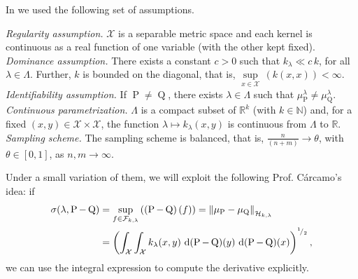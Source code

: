 	In \textcite{Carcamo2024} we used the following set of assumptions.
	\begin{description}
		 \textit{Regularity assumption.} $\mathcal{X}$ is a separable metric space and each kernel is continuous as a real function of one variable (with the other kept fixed).
		 \textit{Dominance assumption.} There exists a constant $c>0$ such that $k_{\lambda}\ll c\,k$, for all $\lambda\in\Lambda$. Further, $k$ is bounded on the diagonal, that is, $\underset{x\in\mathcal{X}}{\operatorname{sup}}\,(k(x,x))<\infty$.
		 \textit{Identifiability assumption.} If $\operatorname{P}\neq\operatorname{Q}$, there exists $\lambda\in\Lambda$ such that $\mu_{\operatorname{P}}^{\lambda}\neq\mu_{\operatorname{Q}}^{\lambda}$.
		 \textit{Continuous parametrization.} $\Lambda$ is a compact subset of $\mathbb{R}^{k}$ (with $k\in\mathbb{N}$) and, for a fixed $(x,y)\in\mathcal{X}\times\mathcal{X}$, the function $\lambda\mapsto k_{\lambda}(x,y)$ is continuous from $\Lambda$ to $\mathbb{R}$.
		 \textit{Sampling scheme.} The sampling scheme is balanced, that is, $\frac{n}{(n+m)}\to\theta$, with $\theta\in[0,1]$, as $n,m\to\infty$.
	\end{description}
	Under a small variation of them, we will exploit the following Prof. C\'{a}rcamo's idea: if
	\begin{equation}\label{Eqn:ProfCarcaIdea}
		\begin{aligned}
			\sigma(\lambda,\operatorname{P}-\operatorname{Q})&=\underset{f\in\mathcal{F}_{k,\lambda}}{\operatorname{sup}}\,((\operatorname{P}-\operatorname{Q})\,(f))=\left\|\mu_{\operatorname{P}}-\mu_{\operatorname{Q}}\right\|_{\mathcal{H}_{k,\lambda}}
			\\&=\left(\int_{\mathcal{X}}\int_{\mathcal{X}}k_{\lambda}(x,y)\,\operatorname{d}(\operatorname{P}-\operatorname{Q})(y)\,\operatorname{d}(\operatorname{P}-\operatorname{Q})(x)\right)^{^{1}\!/_{2}},
		\end{aligned}
	\end{equation}
	we can use the integral expression to compute the derivative explicitly.
	
